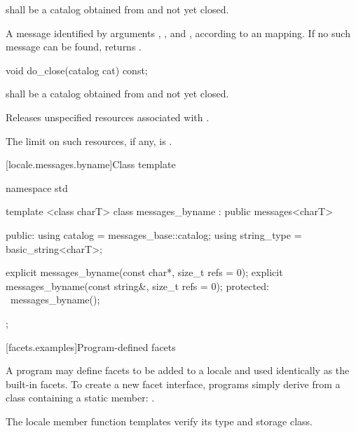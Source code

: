 \begin{itemdescr}
\pnum
\requires
{} shall be a catalog obtained from
and not yet closed.

\pnum
\returns
A message identified by arguments , , and , according
to an  mapping. If no
such message can be found, returns .
\end{itemdescr}

%
\begin{itemdecl}
void do_close(catalog cat) const;
\end{itemdecl}

\begin{itemdescr}
\pnum
\requires
{} shall be a catalog obtained from
and not yet closed.

\pnum
\effects
Releases unspecified resources associated with  .

\pnum
\remarks
The limit on such resources, if any, is .
\end{itemdescr}

[locale.messages.byname]{Class template }

%
\begin{codeblock}
namespace std {
  template <class charT>
  class messages_byname : public messages<charT> {
  public:
    using catalog     = messages_base::catalog;
    using string_type = basic_string<charT>;

    explicit messages_byname(const char*, size_t refs = 0);
    explicit messages_byname(const string&, size_t refs = 0);
  protected:
    ~messages_byname();
  };
}
\end{codeblock}

[facets.examples]{Program-defined facets}

\pnum
A \Cpp program may define facets to be added to a locale and used identically as
the built-in facets.
To create a new facet interface, \Cpp programs simply derive from
a class containing a static member:
.

\pnum
\begin{note}
The locale member function templates verify its type and storage class.
\end{note}

